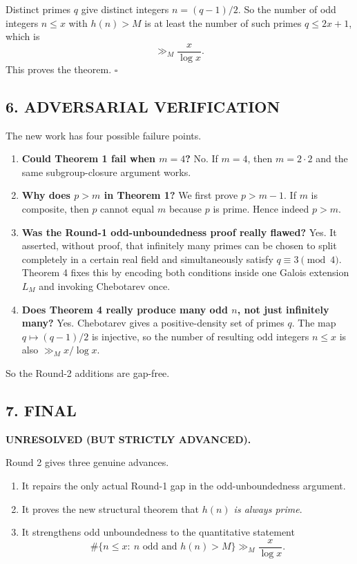 Distinct primes $q$ give distinct integers $n=(q-1)/2$.
So the number of odd integers $n\le x$ with $h(n)>M$ is at least the number of such primes $q\le 2x+1$, which is
\[
\gg_M \frac{x}{\log x}.
\]
This proves the theorem.
\hfill$\square$

\subsection*{6. ADVERSARIAL VERIFICATION}

The new work has four possible failure points.

\begin{enumerate}
\item \textbf{Could Theorem 1 fail when $m=4$?}  
No.
If $m=4$, then $m=2\cdot 2$ and the same subgroup-closure argument works.

\item \textbf{Why does $p>m$ in Theorem 1?}  
We first prove $p>m-1$.
If $m$ is composite, then $p$ cannot equal $m$ because $p$ is prime.
Hence indeed $p>m$.

\item \textbf{Was the Round-1 odd-unboundedness proof really flawed?}  
Yes.
It asserted, without proof, that infinitely many primes can be chosen to split completely in a certain real field and simultaneously satisfy $q\equiv 3\pmod 4$.
Theorem 4 fixes this by encoding both conditions inside one Galois extension $L_M$ and invoking Chebotarev once.

\item \textbf{Does Theorem 4 really produce many odd $n$, not just infinitely many?}  
Yes.
Chebotarev gives a positive-density set of primes $q$.
The map $q\mapsto (q-1)/2$ is injective, so the number of resulting odd integers $n\le x$ is also $\gg_M x/\log x$.
\end{enumerate}

So the Round-2 additions are gap-free.

\subsection*{7. FINAL}

\textbf{UNRESOLVED (BUT STRICTLY ADVANCED).}

Round 2 gives three genuine advances.

\begin{enumerate}
\item It repairs the only actual Round-1 gap in the odd-unboundedness argument.
\item It proves the new structural theorem that \emph{$h(n)$ is always prime}.
\item It strengthens odd unboundedness to the quantitative statement
\[
\#\{n\le x:\ n \text{ odd and } h(n)>M\}\gg_M \frac{x}{\log x}.
\]
\end{enumerate}


